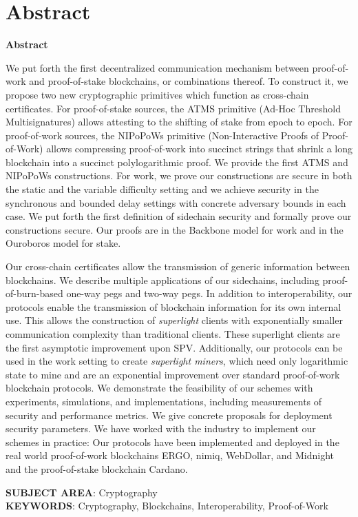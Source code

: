 \ifuniversity
\chapter*{Abstract}
\thispagestyle{empty}
\else
\begin{center}%
  {\bfseries Abstract}%
\end{center}%
\fi

We put forth the first decentralized communication mechanism
between proof-of-work and proof-of-stake blockchains, or combinations thereof.
To construct it, we propose two new cryptographic primitives
which function as cross-chain certificates. For proof-of-stake sources, the ATMS
primitive (Ad-Hoc Threshold Multisignatures) allows attesting to the shifting of
stake from epoch to epoch. For proof-of-work sources, the NIPoPoWs primitive
(Non-Interactive Proofs of Proof-of-Work) allows compressing proof-of-work into
succinct strings that shrink a long blockchain into a succinct polylogarithmic
proof. We provide the first ATMS and NIPoPoWs constructions. For work, we prove
our constructions are secure in both the static and the variable difficulty
setting and we achieve security in the synchronous and bounded delay settings
with concrete adversary bounds in each case. We put forth the first definition
of sidechain security and formally prove our constructions secure. Our proofs
are in the Backbone model for work and in the Ouroboros model for stake.

Our cross-chain certificates allow the transmission of generic information
between blockchains. We describe multiple applications of our sidechains,
including proof-of-burn-based one-way pegs and two-way pegs.
In addition to interoperability, our protocols enable the transmission of
blockchain information for its own internal use. This allows the construction of
\emph{superlight} clients with exponentially smaller communication complexity
than traditional clients. These superlight clients are the first asymptotic
improvement upon SPV. Additionally, our protocols can be used in the work
setting to create \emph{superlight miners}, which need only logarithmic state
to mine and are an exponential improvement over standard proof-of-work
blockchain protocols. We demonstrate the feasibility of our schemes with
experiments, simulations, and implementations, including measurements of
security and performance metrics. We give concrete proposals for deployment
security parameters. We have worked with the industry to implement our schemes
in practice: Our protocols have been implemented and deployed in the real world
proof-of-work blockchains ERGO, nimiq, WebDollar, and Midnight and the
proof-of-stake blockchain Cardano.\\

\ifuniversity
\vfill

{\bfseries SUBJECT AREA}: Cryptography\\

{\bfseries KEYWORDS}: Cryptography, Blockchains, Interoperability, Proof-of-Work
\fi
